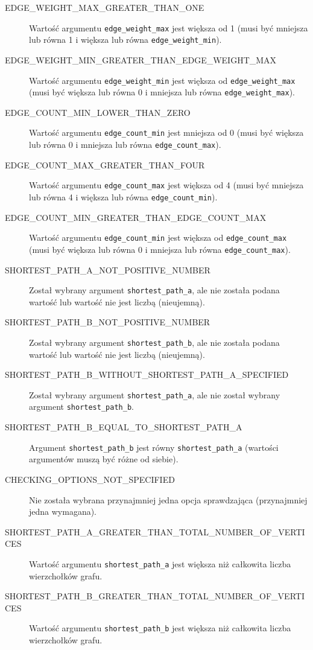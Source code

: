 \documentclass[11pt,a4paper]{report}
\begin{document}
\begin{description}
        \item[EDGE\_WEIGHT\_MAX\_GREATER\_THAN\_ONE] Wartość argumentu \verb|edge_weight_max| jest większa od 1 (musi być mniejsza lub równa 1 i większa lub równa \verb|edge_weight_min|).
        \item[EDGE\_WEIGHT\_MIN\_GREATER\_THAN\_EDGE\_WEIGHT\_MAX] Wartość argumentu \verb|edge_weight_min| jest większa od \verb|edge_weight_max| (musi być większa lub równa 0 i mniejsza lub równa \verb|edge_weight_max|).
        \item[EDGE\_COUNT\_MIN\_LOWER\_THAN\_ZERO] Wartość argumentu \verb|edge_count_min| jest mniejsza od 0 (musi być większa lub równa 0 i mniejsza lub równa \verb|edge_count_max|).
        \item[EDGE\_COUNT\_MAX\_GREATER\_THAN\_FOUR] Wartość argumentu \verb|edge_count_max| jest większa od 4 (musi być mniejsza lub równa 4 i większa lub równa \verb|edge_count_min|).
        \item[EDGE\_COUNT\_MIN\_GREATER\_THAN\_EDGE\_COUNT\_MAX] Wartość argumentu \verb|edge_count_min| jest większa od \verb|edge_count_max| (musi być większa lub równa 0 i mniejsza lub równa \verb|edge_count_max|).
        \item[SHORTEST\_PATH\_A\_NOT\_POSITIVE\_NUMBER] Został wybrany argument \verb|shortest_path_a|, ale nie została podana wartość lub wartość nie jest liczbą (nieujemną).
        \item[SHORTEST\_PATH\_B\_NOT\_POSITIVE\_NUMBER] Został wybrany argument \verb|shortest_path_b|, ale nie została podana wartość lub wartość nie jest liczbą (nieujemną).
        \item[SHORTEST\_PATH\_B\_WITHOUT\_SHORTEST\_PATH\_A\_SPECIFIED] Został wybrany argument \verb|shortest_path_a|, ale nie został wybrany argument \verb|shortest_path_b|.
        \item[SHORTEST\_PATH\_B\_EQUAL\_TO\_SHORTEST\_PATH\_A] Argument \verb|shortest_path_b| jest równy \verb|shortest_path_a| (wartości argumentów muszą być różne od siebie).
        \item[CHECKING\_OPTIONS\_NOT\_SPECIFIED] Nie została wybrana przynajmniej jedna opcja sprawdzająca (przynajmniej jedna wymagana).
        \item[SHORTEST\_PATH\_A\_GREATER\_THAN\_TOTAL\_NUMBER\_OF\_VERTICES] Wartość argumentu \verb|shortest_path_a| jest większa niż całkowita liczba wierzchołków grafu.
        \item[SHORTEST\_PATH\_B\_GREATER\_THAN\_TOTAL\_NUMBER\_OF\_VERTICES] Wartość argumentu \verb|shortest_path_b| jest większa niż całkowita liczba wierzchołków grafu. 
    \end{description}
\end{document}
